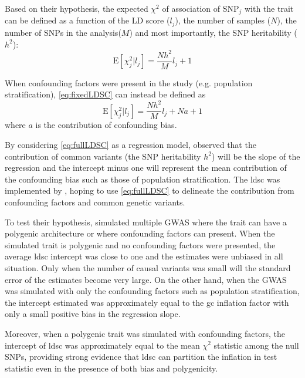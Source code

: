 	Based on their hypothesis, the expected $\chi^2$ of association of \gls{SNP}$_j$ with the trait can be defined as a function of the \gls{LD} score ($l_j$), the number of samples ($N$), the number of \glspl{SNP} in the analysis($M$) and most importantly, the \gls{SNP} heritability ($h^2$):
	\begin{equation}
	\mathrm{E}[\chi^2_j | l_j] = \frac{Nh^2}{M}l_j+1
	\label{eq:fixedLDSC}
	\end{equation}
	
	When confounding factors were present in the study (e.g. population stratification), \cref{eq:fixedLDSC} can instead be defined as
	\begin{equation}
	\mathrm{E}[\chi^2_j | l_j] = \frac{Nh^2}{M}l_j+Na+1
	\label{eq:fullLDSC}
	\end{equation}
	where $a$ is the contribution of confounding bias.
	
	By considering \cref{eq:fullLDSC} as a regression model, \citet{Bulik-Sullivan2015} observed that the contribution of common variants (the \gls{SNP} heritability $h^2$) will be the slope of the regression and the intercept minus one will represent the mean contribution of the confounding bias such as those of population stratification. 
	The \gls{ldsc} was implemented by \citet{Bulik-Sullivan2015}, hoping to use \cref{eq:fullLDSC} to delineate the contribution from confounding factors and common genetic variants.
	
	To test their hypothesis, \citet{Bulik-Sullivan2015} simulated multiple \gls{GWAS} where the trait can have a polygenic architecture or where confounding factors can present.
	When the simulated trait is polygenic and no confounding factors were presented, the average \gls{ldsc} intercept was close to one and the estimates were unbiased in all situation.
	Only when the number of causal variants was small will the standard error of the estimates become very large.
	On the other hand, when the \gls{GWAS} was simulated with only the confounding factors such as population stratification, the intercept estimated was approximately equal to the \gls{gc} inflation factor with only a small positive bias in the regression slope.
	
	Moreover, when a polygenic trait was simulated with confounding factors, the intercept of \gls{ldsc} was approximately equal to the mean $\chi^2$ statistic among the null \glspl{SNP}, providing strong evidence that \gls{ldsc} can partition the inflation in test statistic even in the presence of both bias and polygenicity.
	
